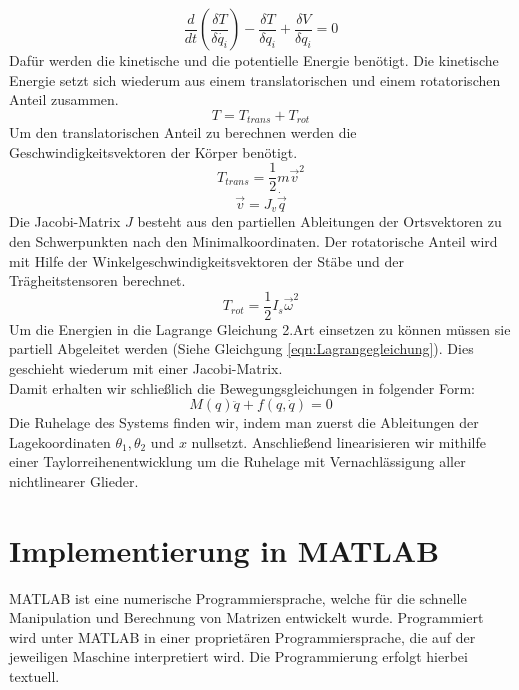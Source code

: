 \documentclass[a4paper, 10pt]{report}
\begin{document}
\begin{equation}
\label{eqn:Lagrangegleichung}
\dfrac{d}{dt}(\dfrac{\delta T}{\delta \dot{q_{i}}})-\dfrac{\delta T}{\delta q_{i}}+\dfrac{\delta V}{\delta q_{i}}=0
\end{equation}
Dafür werden die kinetische und die potentielle Energie benötigt. Die kinetische Energie setzt sich wiederum aus einem translatorischen und einem rotatorischen Anteil zusammen.
\begin{equation}
T=T_{trans}+T_{rot} 
\end{equation}
Um den translatorischen Anteil zu berechnen werden die Geschwindigkeitsvektoren der Körper benötigt.
\begin{equation}
T_{trans}=\dfrac{1}{2} m \vec{v}^{2} 
\end{equation}
\begin{equation}
\vec{v}=J_{v}\dot{\vec{q}}
\end{equation}
Die Jacobi-Matrix $J$ besteht aus den partiellen Ableitungen der Ortsvektoren zu den Schwerpunkten nach den Minimalkoordinaten.
Der rotatorische Anteil wird mit Hilfe der Winkelgeschwindigkeitsvektoren der Stäbe und der Trägheitstensoren berechnet.
\begin{equation}
T_{rot}=\dfrac{1}{2} I_{s} \vec{\omega}^{2}
\end{equation}
Um die Energien in die Lagrange Gleichung 2.Art einsetzen zu können müssen sie partiell Abgeleitet werden (Siehe Gleichgung \ref{eqn:Lagrangegleichung}). Dies geschieht wiederum mit einer Jacobi-Matrix. \\
Damit erhalten wir schließlich die Bewegungsgleichungen in folgender Form:
\begin{equation}
M(q)\ddot{q} + f(q,\dot{q}) = 0
\end{equation}
Die Ruhelage des Systems finden wir, indem man zuerst die Ableitungen der Lagekoordinaten $\theta_{1}, \theta_{2}$ und $x$ nullsetzt. Anschließend linearisieren wir mithilfe einer Taylorreihenentwicklung um die Ruhelage mit Vernachlässigung aller nichtlinearer Glieder.
\chapter{Implementierung in MATLAB}
%
%
MATLAB ist eine numerische Programmiersprache, welche für die schnelle Manipulation und Berechnung von Matrizen entwickelt wurde. Programmiert wird unter MATLAB in einer proprietären Programmiersprache, die auf der jeweiligen Maschine interpretiert wird. Die Programmierung erfolgt hierbei textuell.
\end{document}
